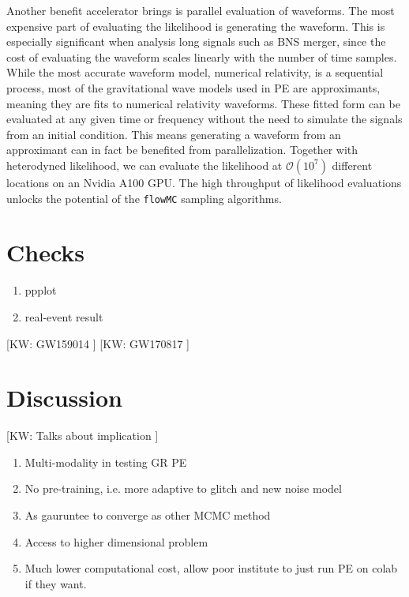 \documentclass[twocolumn]{aastex631}
\newcommand{\kw}[1]{{\color{rb4}[KW: #1 ]}}
\begin{document}
Another benefit accelerator brings is parallel evaluation of waveforms. The most
expensive part of evaluating the likelihood is generating the waveform. This is
especially significant when analysis long signals such as BNS merger, since the
cost of evaluating the waveform scales linearly with the number of time samples.
While the most accurate waveform model, numerical relativity, is a sequential
process, most of the gravitational wave models used in PE are approximants,
meaning they are fits to numerical relativity waveforms. These fitted form can
be evaluated at any given time or frequency without the need to simulate the
signals from an initial condition. This means generating a waveform from an
approximant can in fact be benefited from parallelization. Together with
heterodyned likelihood, we can evaluate the likelihood at $\mathcal{O}(10^7)$
different locations on an Nvidia A100 GPU. The high throughput of likelihood
evaluations unlocks the potential of the \texttt{flowMC} sampling algorithms.

\section{Checks}

\begin{enumerate}
    \item ppplot
    \item real-event result
\end{enumerate}

\kw{GW159014}
\kw{GW170817}

\section{Discussion}

\kw{Talks about implication}
\begin{enumerate}
    \item Multi-modality in testing GR PE
    \item No pre-training, i.e. more adaptive to glitch and new noise model
    \item As gauruntee to converge as other MCMC method
    \item Access to higher dimensional problem
    \item Much lower computational cost, allow poor institute to just run PE on colab if they want.
\end{enumerate}
\end{document}
